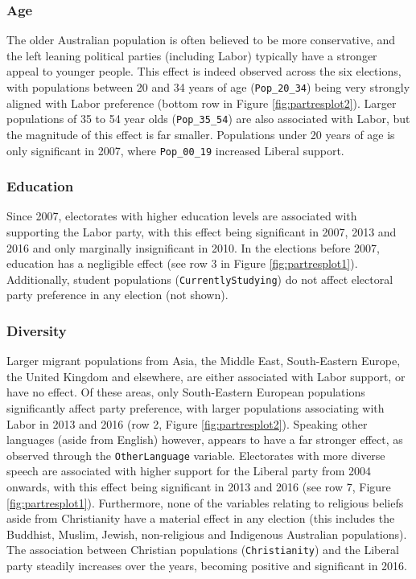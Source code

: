 \documentclass[times, doublespace]{anzsauth}
\begin{document}
\hypertarget{age}{%
\subsubsection*{Age}\label{age}}

The older Australian population is often believed to be more conservative, and the left leaning political parties (including Labor) typically have a stronger appeal to younger people. This effect is indeed observed across the six elections, with populations between 20 and 34 years of age (\texttt{Pop\_20\_34}) being very strongly aligned with Labor preference (bottom row in Figure \ref{fig:partresplot2}). Larger populations of 35 to 54 year olds (\texttt{Pop\_35\_54}) are also associated with Labor, but the magnitude of this effect is far smaller. Populations under 20 years of age is only significant in 2007, where \texttt{Pop\_00\_19} increased Liberal support.

\hypertarget{education}{%
\subsubsection*{Education}\label{education}}

Since 2007, electorates with higher education levels are associated with supporting the Labor party, with this effect being significant in 2007, 2013 and 2016 and only marginally insignificant in 2010. In the elections before 2007, education has a negligible effect (see row 3 in Figure \ref{fig:partresplot1}). Additionally, student populations (\texttt{CurrentlyStudying}) do not affect electoral party preference in any election (not shown).

\hypertarget{diversity}{%
\subsubsection*{Diversity}\label{diversity}}

Larger migrant populations from Asia, the Middle East, South-Eastern Europe, the United Kingdom and elsewhere, are either associated with Labor support, or have no effect. Of these areas, only South-Eastern European populations significantly affect party preference, with larger populations associating with Labor in 2013 and 2016 (row 2, Figure \ref{fig:partresplot2}). Speaking other languages (aside from English) however, appears to have a far stronger effect, as observed through the \texttt{OtherLanguage} variable. Electorates with more diverse speech are associated with higher support for the Liberal party from 2004 onwards, with this effect being significant in 2013 and 2016 (see row 7, Figure \ref{fig:partresplot1}). Furthermore, none of the variables relating to religious beliefs aside from Christianity have a material effect in any election (this includes the Buddhist, Muslim, Jewish, non-religious and Indigenous Australian populations). The association between Christian populations (\texttt{Christianity}) and the Liberal party steadily increases over the years, becoming positive and significant in 2016.
\end{document}
